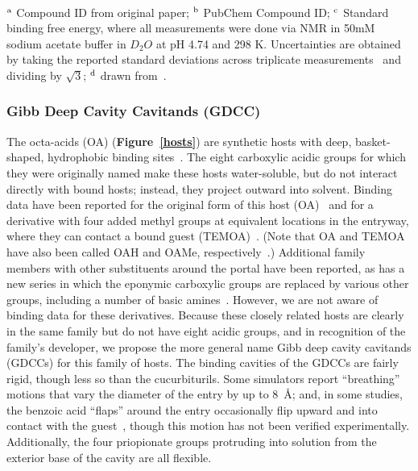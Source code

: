 \documentclass[aps,pre,twocolumn,nofootinbib,superscriptaddress,10pt, final,tightenlines]{revtex4-1}
\begin{document}
\begin{table}
\begin{tabular}{lllp{2cm}>{\ttfamily}lS[table-format=-1.2, table-figures-uncertainty=1]}
\bottomrule
\end{tabular}                                                                                                                                                                                                                                                           \\
$^{\rm a}$ Compound ID from original paper; $^{\rm b}$ PubChem Compound ID; $^{\rm c}$ Standard binding free energy, where all measurements were done via NMR in 50mM sodium acetate buffer in $D_2O$ at pH 4.74 and 298 K. Uncertainties are obtained by taking the reported standard deviations across triplicate measurements~\cite{isaacs_personal_2016} and dividing by $\sqrt 3$;  $^{\rm d}$ drawn from~\cite{liu_cucurbituril_2005}.
\end{table}
\endgroup


\subsubsection{Gibb Deep Cavity Cavitands (GDCC)}


The octa-acids (OA) ({\bf Figure~\ref{hosts}}) are synthetic hosts with deep, basket-shaped, hydrophobic binding sites~\cite{gibb_well-defined_2004}. 
The eight carboxylic acidic groups for which they were originally named make these hosts water-soluble, but do not interact directly with bound hosts; instead, they project outward into solvent. 
Binding data have been reported for the original form of this host (OA)~\cite{gibb_well-defined_2004} and for a derivative with four added methyl groups at equivalent locations in the entryway, where they can contact a bound guest (TEMOA)~\cite{gan_nonmonotonic_2011, sullivan_binding_2016}. 
(Note that OA and TEMOA have also been called OAH and OAMe, respectively~\cite{yin_overview_2016}.) 
Additional family members with other substituents around the portal have been reported, as has a new series in which the eponymic carboxylic groups are replaced by various other groups, including a number of basic amines~\cite{hillyer_synthesis_2016}. 
However, we are not aware of binding data for these derivatives. 
Because these closely related hosts are clearly in the same family but do not have eight acidic groups, and in recognition of the family's developer, we propose the more general name Gibb deep cavity cavitands (GDCCs) for this family of hosts. 
The binding cavities of the GDCCs are fairly rigid, though less so than the cucurbiturils. 
Some simulators report ``breathing'' motions that vary the diameter of the entry by up to 8~\AA \cite{mikulskis_free-energy_2014}; and, in some studies, the benzoic acid ``flaps'' around the entry occasionally flip upward and into contact with the guest~\cite{yin_sampl5_2016, tofoleanu_absolute_2016}, though this motion has not been verified experimentally. 
Additionally, the four priopionate groups protruding into solution from the exterior base of the cavity are all flexible. 
\end{document}
